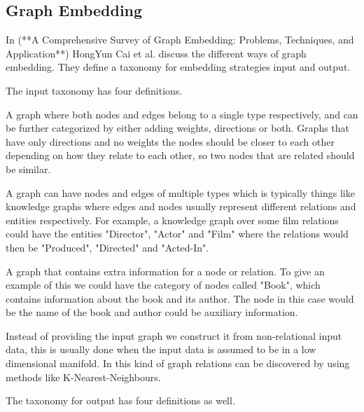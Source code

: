 \subsection{Graph Embedding}
In (**A Comprehensive Survey of Graph Embedding: Problems, Techniques, and Application**) HongYun Cai et al. discuss the different ways of graph embedding. They define a taxonomy for embedding strategies input and output.

The input taxonomy has four definitions.  

\begin{definition} A graph where both nodes and edges belong to a single type respectively, and can be further categorized by either adding weights, directions or both. Graphs that have only directions and no weights the nodes should be closer to each other depending on how they relate to each other, so two nodes that are related should be similar.
\end{definition}

\begin{definition} A graph can have nodes and edges of multiple types which is typically things like knowledge graphs where edges and nodes usually represent different relations and entities respectively. For example, a knowledge graph over some film relations could have the entities "Director", "Actor" and "Film" where the relations would then be "Produced", "Directed" and "Acted-In".
\end{definition}

\begin{definition} A graph that contains extra information for a node or relation. To give an example of this we could have the category of nodes called "Book", which contains information about the book and its author. The node in this case would be the name of the book and author could be auxiliary information.
\end{definition}

\begin{definition} Instead of providing the input graph we construct it from non-relational input data, this is usually done when the input data is assumed to be in a low dimensional manifold. In this kind of graph relations can be discovered by using methods like K-Nearest-Neighbours.
\end{definition}

The taxonomy for output has four definitions as well.

